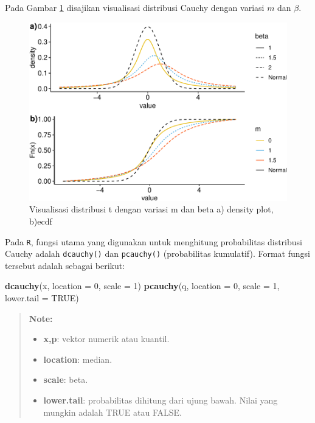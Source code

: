 \documentclass[]{book}
\newenvironment{Shaded}{\begin{snugshade}}{\end{snugshade}}
\newcommand{\KeywordTok}[1]{\textcolor[rgb]{0.13,0.29,0.53}{\textbf{#1}}}
\newcommand{\DataTypeTok}[1]{\textcolor[rgb]{0.13,0.29,0.53}{#1}}
\newcommand{\DecValTok}[1]{\textcolor[rgb]{0.00,0.00,0.81}{#1}}
\newcommand{\OtherTok}[1]{\textcolor[rgb]{0.56,0.35,0.01}{#1}}
\newcommand{\NormalTok}[1]{#1}
\providecommand{\tightlist}{%
  \setlength{\itemsep}{0pt}\setlength{\parskip}{0pt}}
\begin{document}
Pada Gambar \ref{fig:dcauchyvis} disajikan visualisasi distribusi Cauchy
dengan variasi \(m\) dan \(\beta\).

\begin{figure}

{\centering \includegraphics[width=0.9\linewidth]{EnvStat_files/figure-latex/dcauchyvis-1} 

}

\caption{Visualisasi distribusi t dengan variasi m dan beta a) density plot, b)ecdf}\label{fig:dcauchyvis}
\end{figure}

Pada \texttt{R}, fungsi utama yang digunakan untuk menghitung
probabilitas distribusi Cauchy adalah \texttt{dcauchy()} dan
\texttt{pcauchy()} (probabilitas kumulatif). Format fungsi tersebut
adalah sebagai berikut:

\begin{Shaded}
\begin{Highlighting}[]
\KeywordTok{dcauchy}\NormalTok{(x, }\DataTypeTok{location =} \DecValTok{0}\NormalTok{, }\DataTypeTok{scale =} \DecValTok{1}\NormalTok{)}
\KeywordTok{pcauchy}\NormalTok{(q, }\DataTypeTok{location =} \DecValTok{0}\NormalTok{, }\DataTypeTok{scale =} \DecValTok{1}\NormalTok{, }\DataTypeTok{lower.tail =} \OtherTok{TRUE}\NormalTok{)}
\end{Highlighting}
\end{Shaded}

\begin{quote}
\textbf{Note: }

\begin{itemize}
\tightlist
\item
  \textbf{x,p}: vektor numerik atau kuantil.
\item
  \textbf{location}: median.
\item
  \textbf{scale}: beta.
\item
  \textbf{lower.tail}: probabilitas dihitung dari ujung bawah. Nilai
  yang mungkin adalah TRUE atau FALSE.
\end{itemize}
\end{quote}
\end{document}
